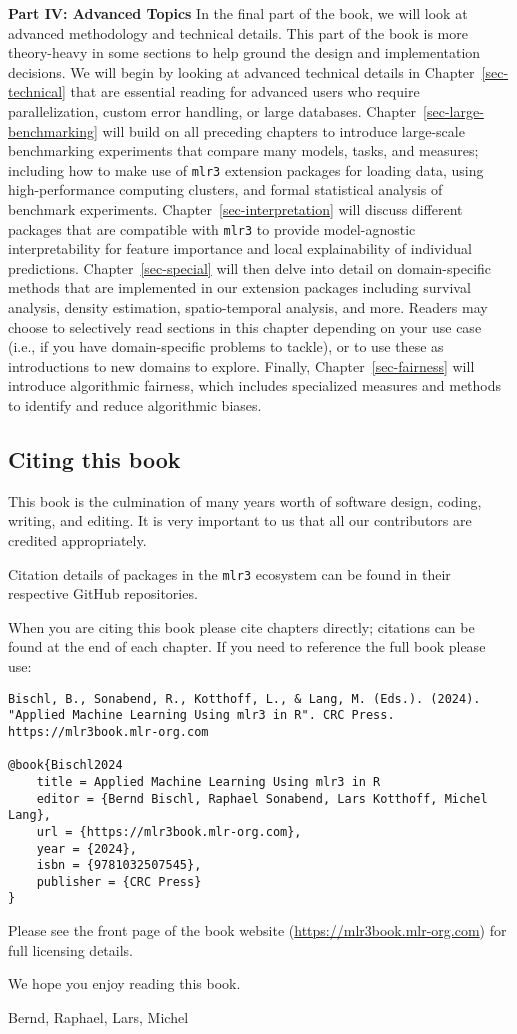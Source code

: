 \textbf{Part IV: Advanced Topics} In the final part of the book, we will
look at advanced methodology and technical details. This part of the
book is more theory-heavy in some sections to help ground the design and
implementation decisions. We will begin by looking at advanced technical
details in Chapter~\ref{sec-technical} that are essential reading for
advanced users who require parallelization, custom error handling, or
large databases. Chapter~\ref{sec-large-benchmarking} will build on all
preceding chapters to introduce large-scale benchmarking experiments
that compare many models, tasks, and measures; including how to make use
of \texttt{mlr3} extension packages for loading data, using
high-performance computing clusters, and formal statistical analysis of
benchmark experiments. Chapter~\ref{sec-interpretation} will discuss
different packages that are compatible with \texttt{mlr3} to provide
model-agnostic interpretability for feature importance and local
explainability of individual predictions. Chapter~\ref{sec-special} will
then delve into detail on domain-specific methods that are implemented
in our extension packages including survival analysis, density
estimation, spatio-temporal analysis, and more. Readers may choose to
selectively read sections in this chapter depending on your use case
(i.e., if you have domain-specific problems to tackle), or to use these
as introductions to new domains to explore. Finally,
Chapter~\ref{sec-fairness} will introduce algorithmic fairness, which
includes specialized measures and methods to identify and reduce
algorithmic biases.

\subsection*{Citing this book}

This book is the culmination of many years worth of software design,
coding, writing, and editing. It is very important to us that all our
contributors are credited appropriately.

Citation details of packages in the \texttt{mlr3} ecosystem can be found
in their respective GitHub repositories.

When you are citing this book please cite chapters directly; citations
can be found at the end of each chapter. If you need to reference the
full book please use:

\begin{verbatim}
Bischl, B., Sonabend, R., Kotthoff, L., & Lang, M. (Eds.). (2024).
"Applied Machine Learning Using mlr3 in R". CRC Press. https://mlr3book.mlr-org.com

@book{Bischl2024
    title = Applied Machine Learning Using mlr3 in R
    editor = {Bernd Bischl, Raphael Sonabend, Lars Kotthoff, Michel Lang},
    url = {https://mlr3book.mlr-org.com},
    year = {2024},
    isbn = {9781032507545},
    publisher = {CRC Press}
}
\end{verbatim}

Please see the front page of the book website
(\url{https://mlr3book.mlr-org.com}) for full licensing details.

\vspace{10mm}

We hope you enjoy reading this book.

\vspace{5mm}

Bernd, Raphael, Lars, Michel